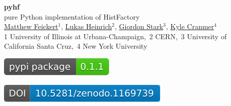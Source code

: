 \documentclass[a0,portrait]{a0poster}
\begin{document}
%
%
%
\begin{minipage}[b]{0.6\linewidth}
 \VERYHuge \color{Black} \textbf{pyhf} \color{Black}\\[0.5cm] %
 \Huge{pure Python implementation of HistFactory}\\[1cm] %
 \color{DarkSlateGray} %
 \LARGE {\href{https://www.matthewfeickert.com/}{\underline{Matthew Feickert}$^{1}$}}, \href{http://www.lukasheinrich.com/}{Lukas Heinrich$^{2}$}, \href{https://giordonstark.com/}{Giordon Stark$^{3}$}, \href{http://theoryandpractice.org/}{Kyle Cranmer$^{4}$}\\[0.5cm] %
 \normalsize {1 University of Illinois at Urbana-Champaign,~2 CERN,~3 University of California Santa Cruz,~4 New York University}\\[1cm]%
 \color{Black}
 \begin{minipage}{0.2\linewidth}
  \begin{center}
   \href{https://pypi.org/project/pyhf/}{\includegraphics[width=\linewidth]{pyhf_PyPI.pdf}}
  \end{center}
 \end{minipage}%
 \quad
 \begin{minipage}{0.3\linewidth}
  \begin{center}
   \href{https://doi.org/10.5281/zenodo.1169739}{\includegraphics[width=\linewidth]{zenodo_doi.pdf}}
  \end{center}
 \end{minipage}%
\end{minipage}
\end{document}
